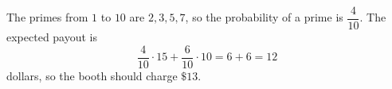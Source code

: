 The primes from $1$ to $10$ are $2,3,5,7$, so the probability of a prime is $\dfrac4{10}$. The expected payout is
\[\dfrac4{10}\cdot15+\dfrac6{10}\cdot10=6+6=12\]
dollars, so the booth should charge $\boxed{\$13}$.
